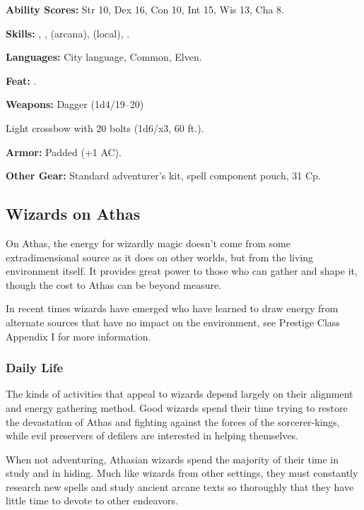 \textbf{Ability Scores:} Str 10, Dex 16, Con 10, Int 15, Wis 13, Cha 8.

\textbf{Skills:} , ,  (arcana),  (local), .

\textbf{Languages:} City language, Common, Elven.

\textbf{Feat:} .

\textbf{Weapons:} Dagger (1d4/19–20)

Light crossbow with 20 bolts (1d6/x3, 60 ft.).

\textbf{Armor:} Padded (+1 AC).

\textbf{Other Gear:} Standard adventurer's kit, spell component pouch, 31 Cp.

\subsection{Wizards on Athas}

On Athas, the energy for wizardly magic doesn't come from some extradimensional source as it does on other worlds, but from the living environment itself. It provides great power to those who can gather and shape it, though the cost to Athas can be beyond measure.

In recent times wizards have emerged who have learned to draw energy from alternate sources that have no impact on the environment, see Prestige Class Appendix I for more information.

\subsubsection{Daily Life}
The kinds of activities that appeal to wizards depend largely on their alignment and energy gathering method. Good wizards spend their time trying to restore the devastation of Athas and fighting against the forces of the sorcerer-kings, while evil preservers of defilers are interested in helping themselves.

When not adventuring, Athasian wizards spend the majority of their time in study and in hiding. Much like wizards from other settings, they must constantly research new spells and study ancient arcane texts so thoroughly that they have little time to devote to other endeavors.

